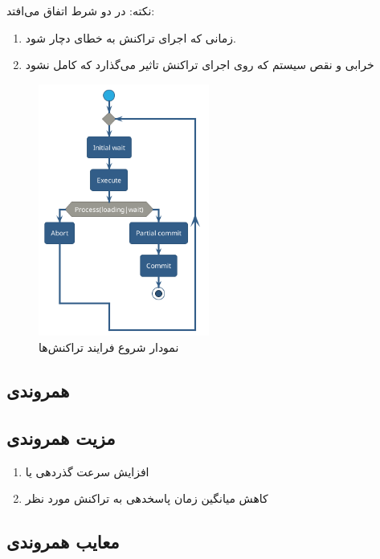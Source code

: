 \documentclass[20pt, a4paper]{article}
\begin{document}
نکته:  در دو شرط اتفاق می‌افتد:

\begin{enumerate}
    \item زمانی که اجرای تراکنش به خطای  دچار شود.
    \item خرابی و نقص سیستم که روی اجرای تراکنش تاثیر می‌گذارد که کامل نشود
\end{enumerate}

\begin{figure}
    \centering
    \includegraphics[width=0.5\textwidth]{umls/transactionStatus.png}
    \caption{نمودار شروع فرایند تراکنش‌ها}
    \label{fig: uml}
\end{figure}

\newpage

\subsection{همروندی}

\subsection{مزیت همروندی}

\begin{enumerate}
    \item افزایش سرعت گذردهی یا 
    \item کاهش میانگین زمان پاسخدهی به تراکنش مورد نظر
\end{enumerate}

\subsection{معایب همروندی} 
\end{document}
